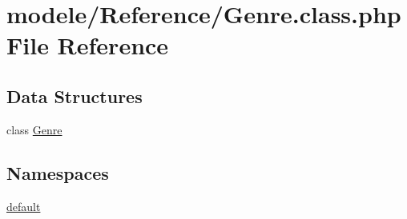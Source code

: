 \hypertarget{_genre_8class_8php}{}\section{modele/\+Reference/\+Genre.class.\+php File Reference}
\label{_genre_8class_8php}
\subsection*{Data Structures}
\begin{DoxyCompactItemize}
\item 
class \hyperlink{class_genre}{Genre}
\end{DoxyCompactItemize}
\subsection*{Namespaces}
\begin{DoxyCompactItemize}
\item 
 \hyperlink{namespacedefault}{default}
\end{DoxyCompactItemize}
